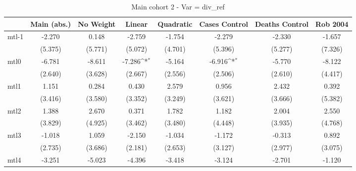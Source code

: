 \documentclass{article}
\begin{document}
{
\def\sym#1{\ifmmode^{#1}\else\(^{#1}\)\fi}
\begin{longtable}{l*{7}{c}}
\caption{Main cohort 2 - Var = div\_ref}\\
\hline\hline\endfirsthead\hline\endhead\hline\endfoot\endlastfoot
                &\multicolumn{1}{c}{Main (abs.)}&\multicolumn{1}{c}{No Weight}&\multicolumn{1}{c}{Linear}&\multicolumn{1}{c}{Quadratic}&\multicolumn{1}{c}{Cases Control}&\multicolumn{1}{c}{Deaths Control}&\multicolumn{1}{c}{Rob 2004}\\
\hline
mtl-1           &   -2.270         &    0.148         &   -2.759         &   -1.754         &   -2.279         &   -2.330         &   -1.657         \\
                &  (5.375)         &  (5.771)         &  (5.072)         &  (4.701)         &  (5.396)         &  (5.277)         &  (7.326)         \\
mtl0            &   -6.781         &   -8.611         &   -7.286\sym{*}  &   -5.164         &   -6.916\sym{*}  &   -5.770         &   -8.122         \\
                &  (2.640)         &  (3.628)         &  (2.667)         &  (2.556)         &  (2.506)         &  (2.610)         &  (4.417)         \\
mtl1            &    1.151         &    0.284         &    0.430         &    2.579         &    0.956         &    2.432         &    0.392         \\
                &  (3.416)         &  (3.580)         &  (3.352)         &  (3.249)         &  (3.621)         &  (3.666)         &  (5.382)         \\
mtl2            &    1.388         &    2.670         &    0.371         &    1.782         &    1.182         &    2.004         &    2.550         \\
                &  (3.829)         &  (4.925)         &  (3.462)         &  (3.480)         &  (4.448)         &  (3.935)         &  (4.768)         \\
mtl3            &   -1.018         &    1.059         &   -2.150         &   -1.034         &   -1.172         &   -0.313         &    0.892         \\
                &  (2.735)         &  (3.686)         &  (2.181)         &  (2.653)         &  (3.127)         &  (2.977)         &  (3.075)         \\
mtl4            &   -3.251         &   -5.023         &   -4.396         &   -3.418         &   -3.124         &   -2.701         &   -1.120         \\

\end{longtable}}
\end{document}
